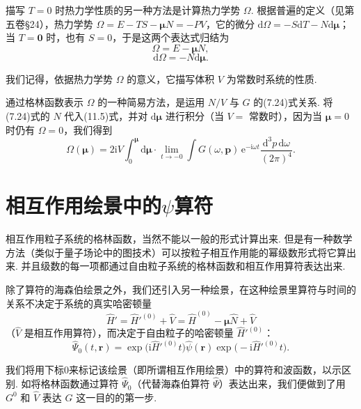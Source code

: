 描写 $T=0$ 时热力学性质的另一种方法是计算热力学势 $\Omega$. 根据普遍的定义（见第五卷§24），热力学势 $\Omega=E-TS-\bm\mu N=-PV$，它的微分 $\mathrm{d}\Omega=-S\mathrm{d}T-N\mathrm{d}\bm\mu$；当 $T=\bm 0$ 时，也有 $S=0$，于是这两个表达式归结为
\begin{equation}
\Omega=E-\bm\mu N,
\end{equation}
\begin{equation}
\mathrm{d}\Omega=-N\mathrm{d}\bm\mu.
\end{equation}

我们记得，依据热力学势 $\Omega$ 的意义，它描写体积 $V$ 为常数时系统的性质.

通过格林函数表示 $\Omega$ 的一种简易方法，是运用 $N/V$ 与 $G$ 的(7.24)式关系. 将(7.24)式的 $N$ 代入(11.5)式，并对 $\mathrm{d}\bm\mu$ 进行积分（当 $V=$ 常数时），因为当 $\bm\mu=0$ 时仍有 $\Omega=0$，我们得到
\begin{equation}
\Omega(\bm\mu)=2\mathrm{i}V\int_0^{\bm\mu}\mathrm{d}\bm\mu\cdot\lim_{t\to-0}\int G(\omega,\bm p)\,\mathrm{e}^{-\mathrm{i}\omega t}\frac{\mathrm{d}^3p\,\mathrm{d}\omega}{(2\pi)^4}.
\end{equation}

\section{相互作用绘景中的\texorpdfstring{$\psi$}{ψ}算符}

相互作用粒子系统的格林函数，当然不能以一般的形式计算出来. 但是有一种数学方法（类似于量子场论中的图技术）可以按粒子相互作用能的幂级数形式将它算出来. 并且级数的每一项都通过自由粒子系统的格林函数和相互作用算符表达出来.

除了算符的海森伯绘景之外，我们还引入另一种绘景，在这种绘景里算符与时间的关系不决定于系统的真实哈密顿量
\begin{equation*}
\hat H'=\hat H'^{(0)}+\hat V=\hat H^{(0)}-\bm\mu\hat N+\hat V
\end{equation*}
（$\hat V$ 是相互作用算符），而决定于自由粒子的哈密顿量 $\hat H'^{(0)}$：
\begin{equation}
\hat\Psi_0(t,\bm r)=\exp\big(\mathrm{i}\hat H'^{(0)}t\big)\hat\psi(\bm r)\exp\big(-\mathrm{i}\hat H'^{(0)}t\big).
\end{equation}

我们将用下标0来标记该绘景（即所谓相互作用绘景）中的算符和波函数，以示区别. 如将格林函数通过算符 $\hat\Psi_0$（代替海森伯算符 $\hat\Psi$）表达出来，我们便做到了用 $G^0$ 和 $\hat V$ 表达 $G$ 这一目的的第一步.

